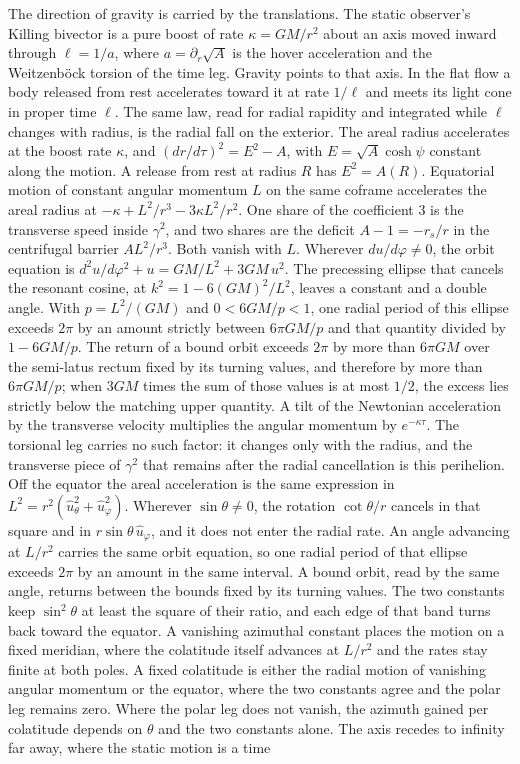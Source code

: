 \documentclass[a4paper]{article}
\begin{document}
The direction of gravity is carried by the translations. The static observer's Killing bivector is a pure boost of rate \(\kappa=GM/r^{2}\) about an axis moved inward through \(\ell=1/a\), where \(a=\partial_{r}\sqrt{A}\) is the hover acceleration and the Weitzenb\"{o}ck torsion of the time leg. Gravity points to that axis. In the flat flow a body released from rest accelerates toward it at rate \(1/\ell\) and meets its light cone in proper time \(\ell\). The same law, read for radial rapidity and integrated while \(\ell\) changes with radius, is the radial fall on the exterior. The areal radius accelerates at the boost rate \(\kappa\), and \((dr/d\tau)^{2}=E^{2}-A\), with \(E=\sqrt{A}\cosh\psi\) constant along the motion. A release from rest at radius \(R\) has \(E^{2}=A(R)\). Equatorial motion of constant angular momentum \(L\) on the same coframe accelerates the areal radius at \(-\kappa+L^{2}/r^{3}-3\kappa L^{2}/r^{2}\). One share of the coefficient \(3\) is the transverse speed inside \(\gamma^{2}\), and two shares are the deficit \(A-1=-r_{s}/r\) in the centrifugal barrier \(A L^{2}/r^{3}\). Both vanish with \(L\). Wherever \(du/d\varphi\neq 0\), the orbit equation is \(d^{2}u/d\varphi^{2}+u=GM/L^{2}+3GM\,u^{2}\). The precessing ellipse that cancels the resonant cosine, at \(k^{2}=1-6(GM)^{2}/L^{2}\), leaves a constant and a double angle. With \(p=L^{2}/(GM)\) and \(0<6GM/p<1\), one radial period of this ellipse exceeds \(2\pi\) by an amount strictly between \(6\pi GM/p\) and that quantity divided by \(1-6GM/p\). The return of a bound orbit exceeds \(2\pi\) by more than \(6\pi GM\) over the semi-latus rectum fixed by its turning values, and therefore by more than \(6\pi GM/p\); when \(3GM\) times the sum of those values is at most \(1/2\), the excess lies strictly below the matching upper quantity. A tilt of the Newtonian acceleration by the transverse velocity multiplies the angular momentum by \(e^{-\kappa\tau}\). The torsional leg carries no such factor: it changes only with the radius, and the transverse piece of \(\gamma^{2}\) that remains after the radial cancellation is this perihelion. Off the equator the areal acceleration is the same expression in \(L^{2}=r^{2}(\hat{u}_{\theta}^{2}+\hat{u}_{\varphi}^{2})\). Wherever \(\sin\theta\neq 0\), the rotation \(\cot\theta/r\) cancels in that square and in \(r\sin\theta\,\hat{u}_{\varphi}\), and it does not enter the radial rate. An angle advancing at \(L/r^{2}\) carries the same orbit equation, so one radial period of that ellipse exceeds \(2\pi\) by an amount in the same interval. A bound orbit, read by the same angle, returns between the bounds fixed by its turning values. The two constants keep \(\sin^{2}\theta\) at least the square of their ratio, and each edge of that band turns back toward the equator. A vanishing azimuthal constant places the motion on a fixed meridian, where the colatitude itself advances at \(L/r^{2}\) and the rates stay finite at both poles. A fixed colatitude is either the radial motion of vanishing angular momentum or the equator, where the two constants agree and the polar leg remains zero. Where the polar leg does not vanish, the azimuth gained per colatitude depends on \(\theta\) and the two constants alone. The axis recedes to infinity far away, where the static motion is a time 
\end{document}
